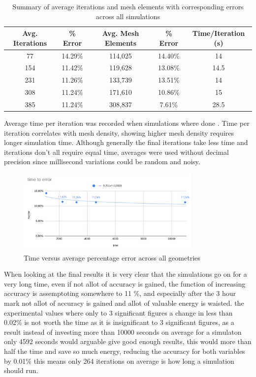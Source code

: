 \documentclass[12pt,a4paper]{article}
\begin{document}
\begin{table}[H]
\centering
\caption{Summary of average iterations and mesh elements with corresponding errors across all simulations}
\label{tab:overall_summary}
\begin{tabular}{|c|c|c|c|c|}
\hline
\rowcolor{lightblue}
\textbf{Avg. Iterations}& \textbf{\% Error} & \textbf{Avg. Mesh Elements}& \textbf{\% Error} & \textbf{Time/Iteration (s)} \\
\hline
77 & 14.29\% & 114,025 & 14.40\% & 14 \\
\hline
154 & 11.42\% & 119,628 & 13.08\% & 14.5 \\
\hline
231 & 11.26\% & 133,739 & 13.51\% & 14 \\
\hline
308 & 11.24\% & 171,610 & 10.86\% & 15 \\
\hline
385 & 11.24\% & 308,837 & 7.61\% & 28.5 \\
\hline
\end{tabular}
\end{table}

Average time per iteration was recorded when simulations where done . Time per iteration correlates with mesh density, showing higher mesh density requires longer simulation time. Although generally the final iterations take less time and iterations don't all require equal time, averages were used without decimal precision since millisecond variations could be random and noisy.

\begin{figure}[H]
    \centering
    \includegraphics[width=0.8\textwidth]{image6.png}
    \caption{Time versus average percentage error across all geometries}
    \label{fig:time_vs_error}
\end{figure}

When looking at the final results it is very clear that the simulations go on for a very long time, even if not allot of accuracy is gained, the function of increasing accuracy is assemptoting somewhere to 11 \%, and especially after the 3 hour mark not allot of accuracy is gained and allot of valuable energy is waisted. the experimental values where only to 3 significant figures a change in less than 0.02\% is not worth the time as it is insignificant to 3 significant figures, as a result instead of investing more than 10000 seconds on average for a simulaton only 4592 seconds would arguable give good enough results, this would more than half the time and save so much energy, reducing the accuracy for both variables by 0.01\% this means only 264 iterations on average is how long a simulation should run.
\end{document}
